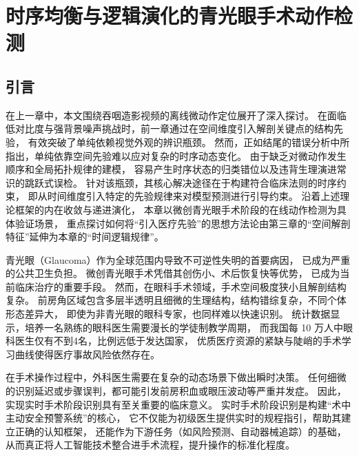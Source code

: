 \chapter{时序均衡与逻辑演化的青光眼手术动作检测}
\section{引言}
在上一章中，本文围绕吞咽造影视频的离线微动作定位展开了深入探讨。
在面临低对比度与强背景噪声挑战时，前一章通过在空间维度引入解剖关键点的结构先验，
有效突破了单纯依赖视觉外观的辨识瓶颈。
然而，正如结尾的错误分析中所指出，单纯依靠空间先验难以应对复杂的时序动态变化。
由于缺乏对微动作发生顺序和全局拓扑规律的建模，
容易产生时序状态的归类错位以及违背生理演进常识的跳跃式误检。
针对该瓶颈，其核心解决途径在于构建符合临床法则的时序约束，
即从时间维度引入特定的先验规律来对模型预测进行引导约束。
沿着上述理论框架的内在收敛与递进演化，
本章以微创青光眼手术阶段的在线动作检测为具体验证场景，
重点探讨如何将“引入医疗先验”的思想方法论由第三章的“空间解剖特征”延伸为本章的“时间逻辑规律”。

青光眼（Glaucoma）作为全球范围内导致不可逆性失明的首要病因，
已成为严重的公共卫生负担\cite{flaxman2017global,sabanayagam2017global}。
微创青光眼手术凭借其创伤小、术后恢复快等优势，
已成为当前临床治疗的重要手段\cite{song2022minimally,zhang2023influence}。
然而，在眼科手术领域，手术空间极度狭小且解剖结构复杂。
前房角区域包含多层半透明且细微的生理结构，结构错综复杂，不同个体形态差异大，
即使为非青光眼的眼科专家，也同样难以快速识别\cite{dietlein2000morphological}。
统计数据显示，培养一名熟练的眼科医生需要漫长的学徒制教学周期，
而我国每 10 万人中眼科医生仅有不到4名，比例远低于发达国家\cite{nhc2022eyehealth, resnikoff2020estimated}，
优质医疗资源的紧缺与陡峭的手术学习曲线使得医疗事故风险依然存在。

在手术操作过程中，外科医生需要在复杂的动态场景下做出瞬时决策。
任何细微的识别延迟或步骤误判，都可能引发前房积血或眼压波动等严重并发症。
因此，实现实时手术阶段识别具有至关重要的临床意义。
实时手术阶段识别是构建“术中主动安全预警系统”的核心，
它不仅能为初级医生提供实时的规程指引，帮助其建立正确的认知框架，
还能作为下游任务（如风险预测、自动器械追踪）的基础，
从而真正将人工智能技术整合进手术流程，提升操作的标准化程度。

